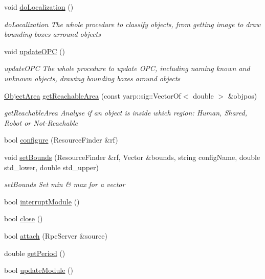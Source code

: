 \begin{DoxyCompactItemize}
void \hyperlink{group__iol2opc_abc489aac7033917618fd74ddb318a213}{do\+Localization} ()
\begin{DoxyCompactList}\small\item\em do\+Localization The whole procedure to classify objects, from getting image to draw bounding boxes arround objects \end{DoxyCompactList}\item 
void \hyperlink{group__iol2opc_ab3fd466f349b214e52cc524b837e2277}{update\+O\+PC} ()
\begin{DoxyCompactList}\small\item\em update\+O\+PC The whole procedure to update O\+PC, including naming known and unknown objects, drawing bounding boxes around objects \end{DoxyCompactList}\item 
\hyperlink{namespaceicubclient_a582031d3e105cc59d614d15d30d22e65}{Object\+Area} \hyperlink{group__iol2opc_a4cecacb6f48875b87a6e9351d9d46a5d}{get\+Reachable\+Area} (const yarp\+::sig\+::\+Vector\+Of$<$ double $>$ \&objpos)
\begin{DoxyCompactList}\small\item\em get\+Reachable\+Area Analyse if an object is inside which region\+: Human, Shared, Robot or Not-\/\+Reachable \end{DoxyCompactList}\item 
bool \hyperlink{group__iol2opc_a1d25f5c96f5e5992c7f442e954e3759a}{configure} (Resource\+Finder \&rf)
\item 
void \hyperlink{group__iol2opc_a3acbd9194837f89ab917d81bd0513c21}{set\+Bounds} (Resource\+Finder \&rf, Vector \&bounds, string config\+Name, double std\+\_\+lower, double std\+\_\+upper)
\begin{DoxyCompactList}\small\item\em set\+Bounds Set min \& max for a vector \end{DoxyCompactList}\item 
bool \hyperlink{group__iol2opc_a476b04172d3e7b3a7f97d4129542ebb8}{interrupt\+Module} ()
\item 
bool \hyperlink{group__iol2opc_aa9245a6a4ab492288cf7dc776b0cdad8}{close} ()
\item 
bool \hyperlink{group__iol2opc_af569c67872e76a8e9cfa765f30ec8e06}{attach} (Rpc\+Server \&source)
\item 
double \hyperlink{group__iol2opc_a0b50085b3c3a57fde55d2241bc1bdee8}{get\+Period} ()
\item 
bool \hyperlink{group__iol2opc_aaf70332dcf01dc12e2b849c4ff6620af}{update\+Module} ()
\end{DoxyCompactItemize}
